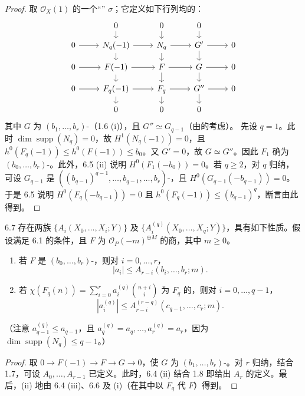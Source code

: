 \begin{proof}
取 $\mathscr O_X(1)$ 的一个“” $\sigma$；它定义如下行列均的：
\[
\begin{tikzcd}[row sep=small]
&0\arrow[d]&0\arrow[d]&0\arrow[d]&\\
0\arrow[r]&N_q(-1)\arrow[r]\arrow[d]&N_q\arrow[r]\arrow[d]&G'\arrow[r]\arrow[d]&0\\
0\arrow[r]&F(-1)\arrow[r]\arrow[d]&F\arrow[r]\arrow[d]&G\arrow[r]\arrow[d]&0\\
0\arrow[r]&F_q(-1)\arrow[r]\arrow[d]&F_q\arrow[r]\arrow[d]&G''\arrow[r]\arrow[d]&0\\
&0&0&0&
\end{tikzcd}
\]
其中 $G$ 为 $(b_1,\ldots,b_r)$-（1.6 (i)），且 $G''\simeq G_{q-1}$（由的考虑）。
先设 $q=1$。此时 $\dim\operatorname{supp}(N_q)=0$，故 $H^1(N_q(-1))=0$，且 $h^0(F_q(-1))\leq h^0(F(-1))\leq b_0$。又 $G'=0$，故 $G\simeq G''$。因此 $F_1$ 确为 $(b_0,\ldots,b_r)$-。此外，6.5 (ii) 说明 $H^0(F_1(-b_0))=0$。若 $q\geq2$，对 $q$ 归纳，可设 $G_{q-1}$ 是 $((b_{q-1})^{q-1},\ldots,b_{q-1},\ldots,b_r)$-，且 $H^0(G_{q-1}(-b_{q-1}))=0$。于是 6.5 说明 $H^0(F_q(-b_{q-1}))=0$ 且 $h^0(F_q(-1))\leq(b_{q-1})^q$，断言由此得到。
\end{proof}
\begin{SGAresult}{}{6.7}
存在两族 $\{A_i(X_0,\ldots,X_i;Y)\}$ 及 $\{A_i^{(q)}(X_0,\ldots,X_q;Y)\}$，具有如下性质。假设满足 6.1 的条件，且 $F$ 为 $\mathscr O_P(-m)^{\oplus M}$ 的商，其中 $m\geq0$。
\begin{enumerate}
\item[(i)] 若 $F$ 是 $(b_0,\ldots,b_r)$-，则对 $i=0,\ldots,r$，
\[|a_i|\leq A_{r-i}(b_i,\ldots,b_r;m).\]
\item[(ii)] 若 $\chi(F_q(n))=\sum_{i=0}^r a_i^{(q)}\binom{n+i}{i}$ 为 $F_q$ 的，则对 $i=0,\ldots,q-1$，
\[|a_i^{(q)}|\leq A_{r-i}^{(r-q)}(c_{q-1},\ldots,c_r;m).\]
\end{enumerate}
（注意 $a_{q-1}^{(q)}\leq a_{q-1}$，且 $a_q^{(q)}=a_q,\ldots,a_r^{(q)}=a_r$，因为 $\dim\operatorname{supp}(N_q)\leq q-1$。）
\end{SGAresult}
\begin{proof}
取 $0\to F(-1)\to F\to G\to0$，使 $G$ 为 $(b_1,\ldots,b_r)$-。对 $r$ 归纳，结合 1.7，可设 $A_0,\ldots,A_{r-1}$ 已定义。此时，6.4 (ii) 结合 1.8 即给出 $A_r$ 的定义。最后，(ii) 地由 6.4 (iii)、6.6 及 (i)（在其中以 $F_q$ 代 $F$）得到。
\end{proof}
